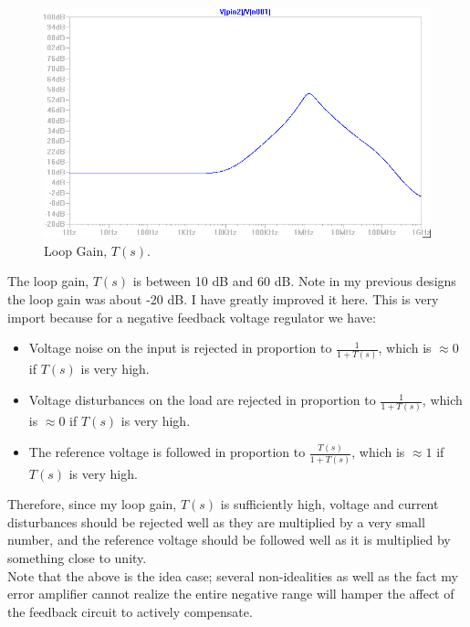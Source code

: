 \documentclass[10pt]{amsart}
\begin{document}
\begin{figure}[h]
	\begin{center}
		\includegraphics[width=6in]{Media/lg.png}
	\end{center}
	\caption{Loop Gain, $T(s)$.}
	\label{fig:pidfb}
\end{figure}

The loop gain, $T(s)$ is between 10 dB and 60 dB. Note in my previous designs the loop gain was about -20 dB. I have greatly improved it here. This is very import because for a negative feedback voltage regulator we have:\\

\begin{itemize}
\item Voltage noise on the input is rejected in proportion to $\frac{1}{1 + T(s)}$, which is $ \approx 0$ if $T(s)$ is very high.
\item Voltage disturbances on the load are rejected in proportion to $\frac{1}{1 + T(s)}$, which is $ \approx 0$ if $T(s)$ is very high.
\item The reference voltage is followed in proportion to $\frac{T(s)}{1 + T(s)}$, which is $ \approx 1$ if $T(s)$ is very high. \\
\end{itemize}

Therefore, since my loop gain, $T(s)$ is sufficiently high, voltage and current disturbances should be rejected well as they are multiplied by a very small number, and the reference voltage should be followed well as it is multiplied by something close to unity. \\

Note that the above is the idea case; several non-idealities as well as the fact my error amplifier cannot realize the entire negative range will hamper the affect of the feedback circuit to actively compensate.
 
\end{document}

